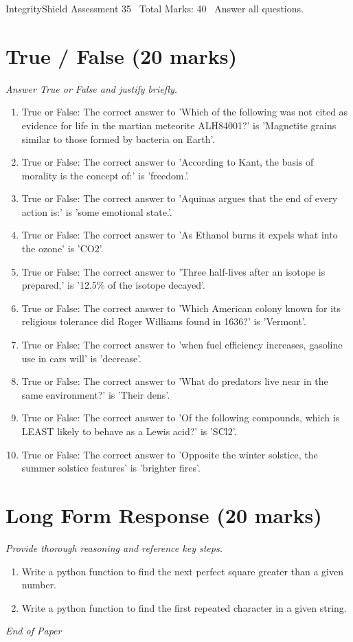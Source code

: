 \documentclass[12pt]{article}
\begin{document}
\begin{center}
IntegrityShield Assessment 35 \
Total Marks: 40 \
Answer all questions.
\end{center}

\section*{True / False (20 marks)}
\textit{Answer True or False and justify briefly.}
\begin{enumerate}[label=\arabic*.]
\item True or False: The correct answer to 'Which of the following was not cited as evidence for life in the martian meteorite ALH84001?' is 'Magnetite grains similar to those formed by bacteria on Earth'.
\item True or False: The correct answer to 'According to Kant, the basis of morality is the concept of:' is 'freedom.'.
\item True or False: The correct answer to 'Aquinas argues that the end of every action is:' is 'some emotional state.'.
\item True or False: The correct answer to 'As Ethanol burns it expels what into the ozone' is 'CO2'.
\item True or False: The correct answer to 'Three half-lives after an isotope is prepared,' is '12.5\% of the isotope decayed'.
\item True or False: The correct answer to 'Which American colony known for its religious tolerance did Roger Williams found in 1636?' is 'Vermont'.
\item True or False: The correct answer to 'when fuel efficiency increases, gasoline use in cars will' is 'decrease'.
\item True or False: The correct answer to 'What do predators live near in the same environment?' is 'Their dens'.
\item True or False: The correct answer to 'Of the following compounds, which is LEAST likely to behave as a Lewis acid?' is 'SCl2'.
\item True or False: The correct answer to 'Opposite the winter solstice, the summer solstice features' is 'brighter fires'.
\end{enumerate}

\section*{Long Form Response (20 marks)}
\textit{Provide thorough reasoning and reference key steps.}
\begin{enumerate}[label=\arabic*.]
\item Write a python function to find the next perfect square greater than a given number.
\item Write a python function to find the first repeated character in a given string.
\end{enumerate}

\vfill
\noindent\textit{End of Paper}
\end{document}

